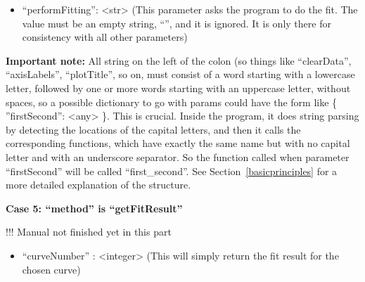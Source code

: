 \documentclass[11pt]{article} %
\begin{document}
\begin{tcolorbox}[breakable,title=Sending ``params'' to the server]
\begin{itemize}
\item ``performFitting'': <str> (This parameter asks the program to do the fit. The value must be an empty string, ``'', and it is ignored. It is only there for consistency with all other parameters)

\end{itemize}

\textbf{Important note:} All string on the left of the colon (so things like ``clearData'', ``axisLabels'', ``plotTitle'', so on, must consist of a word starting with a lowercase letter, followed by one or more words starting with an uppercase letter, without spaces, so a possible dictionary to go with params could have the form like { \{ {''}firstSecond{''}: <any> \}}. This is crucial. Inside the program, it does string parsing by detecting the locations of the capital letters, and then it calls the corresponding functions, which have exactly the same name but with no capital letter and with an underscore separator. So the function called when parameter ``firstSecond'' will be called ``first\_second''. See Section~\ref{basicprinciples} for a more detailed explanation of the structure.  

\textbf{Case 5: ``method'' is ``getFitResult''}

!!! Manual not finished yet in this part

\begin{itemize}
\item ``curveNumber'' : <integer> (This will simply return the fit result for the chosen curve)
\end{itemize}

\end{tcolorbox}



 
\end{document}
